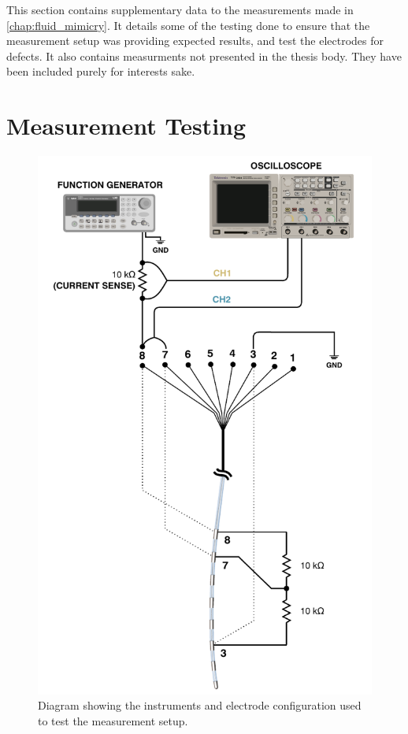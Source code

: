 This section contains supplementary data to the measurements made in \cref{chap:fluid_mimicry}.
It details some of the testing done to ensure that the measurement setup was providing expected results, and test the electrodes for defects.
It also contains measurments not presented in the thesis body.
They have been included purely for interests sake.

\section{Measurement Testing}

\begin{figure}
    \centering
    \includegraphics[width=\textwidth]{content/appendices/Solution-Impedance-Measurements/graphics/Solution-Impedance-Testing-Setup}
    \caption{\label{fig:solution_impedance_testing_setup}Diagram showing the instruments and electrode configuration used to test the measurement setup.}
\end{figure}

